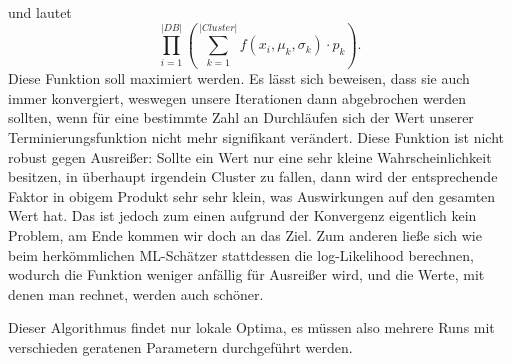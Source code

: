 und lautet
\[ \prod_{i=1}^{|DB|}\left( \sum_{k=1}^{|Cluster|} 
f(x_i,\mu_k,\sigma_k) \cdot p_k \right). \]
Diese Funktion soll maximiert werden. Es lässt sich beweisen, dass sie auch immer
konvergiert, weswegen unsere Iterationen dann abgebrochen werden sollten, 
wenn für eine bestimmte Zahl an Durchläufen sich der Wert unserer
Terminierungsfunktion nicht mehr signifikant verändert. Diese Funktion ist nicht
robust gegen Ausreißer: Sollte ein Wert nur eine sehr kleine Wahrscheinlichkeit besitzen,
in überhaupt irgendein Cluster zu fallen, dann wird der entsprechende Faktor in
obigem Produkt sehr sehr klein, was Auswirkungen auf den gesamten Wert hat. 
Das ist jedoch zum einen aufgrund der Konvergenz eigentlich kein Problem, am
Ende kommen wir doch an das Ziel. Zum anderen ließe sich wie beim 
herkömmlichen ML-Schätzer stattdessen die log-Likelihood berechnen, wodurch
die Funktion weniger anfällig für Ausreißer wird, und die Werte, mit denen man
rechnet, werden auch schöner.

Dieser Algorithmus findet nur lokale Optima, es müssen also mehrere Runs
mit verschieden geratenen Parametern durchgeführt werden.


